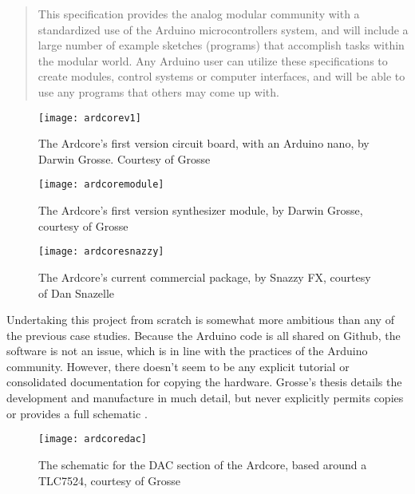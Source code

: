\begin{quote}

	This specification provides the analog modular community with a standardized use of the Arduino microcontrollers system, and will include a large number of example sketches (programs) that accomplish tasks within the modular world. Any Arduino user can utilize these specifications to create modules, control systems or computer interfaces, and will be able to use any programs that others may come up with.
	
	\end{quote}
	
	\citep{grosse2011}
		
		\begin{figure}[H]
		  \caption{The Ardcore's first version circuit board, with an Arduino nano, by Darwin Grosse. Courtesy of Grosse}
		  \centering
		    \texttt{[image: ardcorev1]}
		\end{figure}
		
		\begin{figure}[H]
		  \caption{The Ardcore's first version synthesizer module, by Darwin Grosse, courtesy of Grosse}
		  \centering
		    \texttt{[image: ardcoremodule]}
		\end{figure}
		
		\begin{figure}[H]
		  \caption{The Ardcore's current commercial package, by Snazzy FX, courtesy of Dan Snazelle}
		  \centering
		    \texttt{[image: ardcoresnazzy]}
		\end{figure}

Undertaking this project from scratch is somewhat more ambitious than any of the previous case studies. Because the Arduino code is all shared on Github, the software is not an issue, which is in line with the practices of the Arduino community. However, there doesn't seem to be any explicit tutorial or consolidated documentation for copying the hardware. Grosse's thesis details the development and manufacture in much detail, but never explicitly permits copies or provides a full schematic \citep[pp.21-31]{grosse2011}. 

		\begin{figure}[H]
		  \caption{The schematic for the DAC section of the Ardcore, based around a TLC7524, courtesy of Grosse}
		  \centering
		    \texttt{[image: ardcoredac]}
		\end{figure}
		
